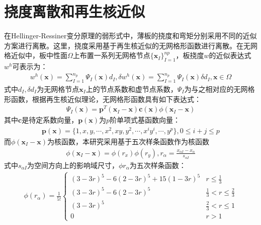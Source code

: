 \documentclass[11pt,a4paper]{article}
\begin{document}
\section{挠度离散和再生核近似}
在Hellinger-Ressiner变分原理的弱形式中，薄板的挠度和弯矩分别采用不同的近似方案进行离散。这里，挠度采用基于再生核近似的无网格形函数进行离散。在无网格近似中，板中性面$\Omega$上布置一系列无网格节点$\{\pmb{x}_I\}_{I=1}^{np}$，板挠度$w$的近似表达式$w^h$可表示为：
\begin{equation}
\begin{split}
    w^h(\pmb{x})=\sum_{I=1}^{n_p}\Psi_I(\pmb{x})d_I,\delta w^h(\pmb{x})=\sum_{I=1}^{n_p}\Psi_I(\pmb{x})\delta d_I,\pmb{x}\in\Omega
\end{split}
\end{equation}
式中$d_{I},\delta d_I$为无网格节点$\pmb{x}_I$上的节点系数和虚节点系数，$\Psi_I$为与之相对应的无网格形函数，根据再生核近似理论，无网格形函数具有如下表达式：
\begin{equation}
\begin{split}
    \Psi_I(\pmb{x})=\pmb{p}^T(\pmb{x}_I-\pmb{x})\pmb{c}(\pmb{x})\phi(\pmb{x}_I-\pmb{x})
\end{split}
\end{equation}
其中$\pmb{c}$是待定系数向量，$\pmb{p}(\pmb{x})$为$p$阶单项式基函数向量：
\begin{equation}
\begin{split}
    \pmb{p}(\pmb{x})=\{1,x,y,\dotsb ,x^2,xy,y^2,\dotsb,x^iy^i,\dotsb,y^p\},0\le i+j\le p
\end{split}
\end{equation}
而$\phi(\pmb{x}_I-\pmb{x})$为核函数，本研究采用基于五次样条函数作为核函数
\begin{equation}
\begin{split}
    \phi(\pmb{x}_I-\pmb{x})=\phi(r_x)\phi(r_y),r_{\alpha}=\frac{x_{\alpha I}-x_{\alpha}}{s_{\alpha I}}
\end{split}
\end{equation}
式中$s_{\alpha I}$为空间方向上的影响域尺寸，$\phi r_{\alpha}$为五次样条函数：
\begin{equation}
\begin{split}
    \phi(r_{\alpha})=\frac{1}{5!}\begin{cases}
        (3-3r)^5-6(2-3r)^5+15(1-3r)^5&r\le\frac{1}{3}\\
        (3-3r)^5-6(2-3r)^5&\frac{1}{3}<r\le\frac{2}{3}\\
        (3-3r)^5&\frac{2}{3}<r\le1\\
        0&r>1
    \end{cases}
\end{split}
\end{equation}\par
\end{document}
